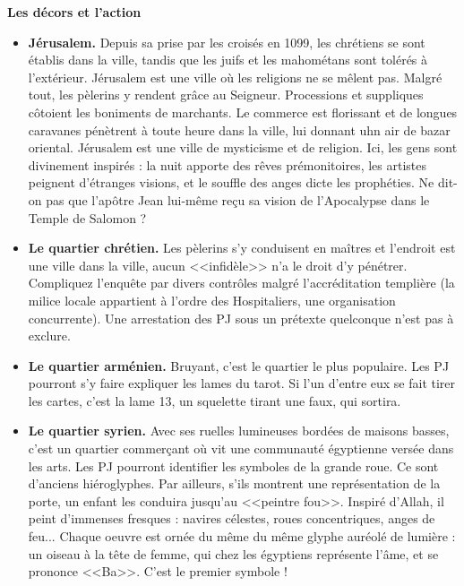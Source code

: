\documentclass[11pt,twoside,a4paper]{book}
\begin{document}
\clearpage

\textbf{Les d{\'e}cors et l'action}~\\

\begin{itemize}
	\item \textbf{J{\'e}rusalem. }Depuis sa prise par les crois{\'e}s en 1099, les chr{\'e}tiens se sont {\'e}tablis dans la ville, tandis que les juifs et les mahom{\'e}tans sont tol{\'e}r{\'e}s {\`a} l'ext{\'e}rieur. J{\'e}rusalem est une ville o{\`u} les religions ne se m{\^e}lent pas. Malgr{\'e} tout, les p{\`e}lerins y rendent gr{\^a}ce au Seigneur. Processions et suppliques c{\^o}toient les boniments de marchants. Le commerce est florissant et de longues caravanes p{\'e}n{\`e}trent {\`a} toute heure dans la ville, lui donnant uhn air de bazar oriental. J{\'e}rusalem est une ville de mysticisme et de religion. Ici, les gens sont divinement inspir{\'e}s : la nuit apporte des r{\^e}ves pr{\'e}monitoires, les artistes peignent d'{\'e}tranges visions, et le souffle des anges dicte les proph{\'e}ties. Ne dit-on pas que l'ap{\^o}tre Jean lui-m{\^e}me re\c{c}u sa vision de l'Apocalypse dans le Temple de Salomon ?
	\item \textbf{Le quartier chr{\'e}tien. }Les p{\`e}lerins s'y conduisent en ma{\^i}tres et l'endroit est une ville dans la ville, aucun <<infid{\`e}le>> n'a le droit d'y p{\'e}n{\'e}trer. Compliquez l'enqu{\^e}te par divers contr{\^o}les malgr{\'e} l'accr{\'e}ditation templi{\`e}re (la milice locale appartient {\`a} l'ordre des Hospitaliers, une organisation concurrente). Une arrestation des PJ sous un pr{\'e}texte quelconque n'est pas {\`a} exclure.
	\item \textbf{Le quartier arm{\'e}nien. }Bruyant, c'est le quartier le plus populaire. Les PJ pourront s'y faire expliquer les lames du tarot. Si l'un d'entre eux se fait tirer les cartes, c'est la lame 13, un squelette tirant une faux, qui sortira.
	\item \textbf{Le quartier syrien. }Avec ses ruelles lumineuses bord{\'e}es de maisons basses, c'est un quartier commer\c{c}ant o{\`u} vit une communaut{\'e} {\'e}gyptienne vers{\'e}e dans les arts. Les PJ pourront identifier les symboles de la grande roue. Ce sont d'anciens hi{\'e}roglyphes. Par ailleurs, s'ils montrent une repr{\'e}sentation de la porte, un enfant les conduira jusqu'au <<peintre fou>>. Inspir{\'e} d'Allah, il peint d'immenses fresques : navires c{\'e}lestes, roues concentriques, anges de feu... Chaque oeuvre est orn{\'e}e du m{\^e}me du m{\^e}me glyphe aur{\'e}ol{\'e} de lumi{\`e}re : un oiseau {\`a} la t{\^e}te de femme, qui chez les {\'e}gyptiens repr{\'e}sente l'{\^a}me, et se prononce <<Ba>>. C'est le premier symbole !

\end{itemize}
\end{document}
